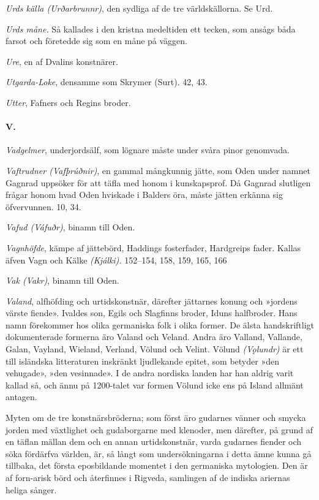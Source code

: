 \emph{Urds källa (Urðarbrunnr)}, den sydliga af de tre världskällorna.
Se Urd.

\emph{Urds måne.} Så kallades i den kristna medeltiden ett tecken, som
ansågs båda farsot och företedde sig som en måne på väggen.

\emph{Ure}, en af Dvalins konstnärer.

\emph{Utgarda-Loke}, densamme som Skrymer (Surt). 42, 43.

\emph{Utter}, Fafners och Regins broder.

\paragraph{V.}

\emph{Vadgelmer}, underjordsälf, som lögnare måste under svåra pinor
genomvada.

\emph{Vaftrudner (Vafþrúðnir)}, en gammal mångkunnig jätte, som Oden
under namnet Gagnrad uppsöker för att täfla med honom i kunskapsprof. Då
Gagnrad slutligen frågar honom hvad Oden hviskade i Balders öra, måste
jätten erkänna sig öfvervunnen. 10, 34.

\emph{Vafud (Váfuðr)}, binamn till Oden.

\emph{Vagnhöfde}, kämpe af jättebörd, Haddings fosterfader, Hardgreips
fader. Kallas äfven Vagn och Kälke \emph{(Kjálki).} 152--154, 158, 159,
165, 166

\emph{Vak (Vakr)}, binamn till Oden.

\emph{Valand}, alfhöfding och urtidskonstnär, därefter jättarnes konung
och »jordens värste fiende». Ivaldes son, Egils och Slagfinns broder,
Iduns halfbroder. Hans namn förekommer hos olika germaniska folk i olika
former. De älsta handskriftligt dokumenterade formerna äro Valand och
Veland. Andra äro Valland, Vallande, Galan, Vayland, Wieland, Verland,
Völund och Velint. Völund \emph{(Vǫlundr)} är ett till isländska
litteraturen inskränkt ljudlekande epitet, som betyder »den vehugade»,
»den vesinnade». I de andra nordiska landen har han aldrig varit kallad
så, och ännu på 1200-talet var formen Völund icke ens på Island allmänt
antagen.

Myten om de tre konstnärsbröderna; som först äro gudarnes
vänner\protect\hypertarget{lb1625905.xhtmlux5cux23start244}{}{}\protect\hypertarget{lb1625905.xhtmlux5cux23start244-a}{}{}\protect\hypertarget{lb1625905.xhtmlux5cux23start244-b}{}{}\protect\hypertarget{lb1625905.xhtmlux5cux23start244-c}{}{}\protect\hypertarget{lb1625905.xhtmlux5cux23start244-d}{}{}
och smycka jorden med växtlighet och gudaborgarne med klenoder, men
därefter, på grund af en täflan mällan dem och en annan urtidskonstnär,
varda gudarnes fiender och söka fördärfva världen, är, så långt som
undersökningarna i detta ämne kunna gå tillbaka, det första eposbildande
momentet i den germaniska mytologien. Den är af forn-arisk börd och
återfinnes i Rigveda, samlingen af de indiska ariernas heliga sånger.

